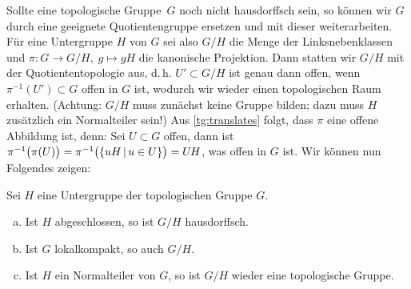 Sollte eine topologische Gruppe~$G$ noch nicht hausdorffsch sein, so können wir
$G$ durch eine geeignete Quotientengruppe ersetzen und mit dieser
weiterarbeiten. Für eine Untergruppe $H$ von $G$ sei also $G/H$ die Menge der
Linksnebenklassen und $\pi\colon G \to G/H,\; g\mapsto gH$ die kanonische
Projektion. Dann statten wir $G/H$ mit der Quotiententopologie aus, d.\,h.
$U'\subset G/H$ ist genau dann offen, wenn $\pi^{-1}(U') \subset G$ offen in $G$
ist, wodurch wir wieder einen topologischen Raum erhalten. (Achtung: $G/H$
muss zunächst keine Gruppe bilden; dazu muss $H$ zusätzlich ein Normalteiler
sein!) Aus \cref{tg:translates} folgt, dass $\pi$ eine offene Abbildung ist,
denn: Sei $U \subset G$ offen, dann ist $\pi^{-1}\bigl( \pi(U) \bigr)
= \pi^{-1}\bigl( \{ uH \Mid u\in U \} \bigr) = U\mkern-1.5mu H$, was offen in $G$ ist.
Wir können nun Folgendes zeigen:
%
\begin{thLemma}
    \label{tg:quot}
    Sei $H$ eine Untergruppe der topologischen Gruppe $G$.
    \begin{enumerate}[a)]
        \item\label{tg:quot:hausdorff}
            Ist $H$ abgeschlossen, so ist $G/H$ hausdorffsch.
        \item\label{tg:quot:lcompact}
            Ist $G$ lokalkompakt, so auch $G/H$.
        \item\label{tg:quot:topogrp}
            Ist $H$ ein Normalteiler von $G$, so ist $G/H$ wieder eine
            topologische Gruppe.
    \end{enumerate}
\end{thLemma}

